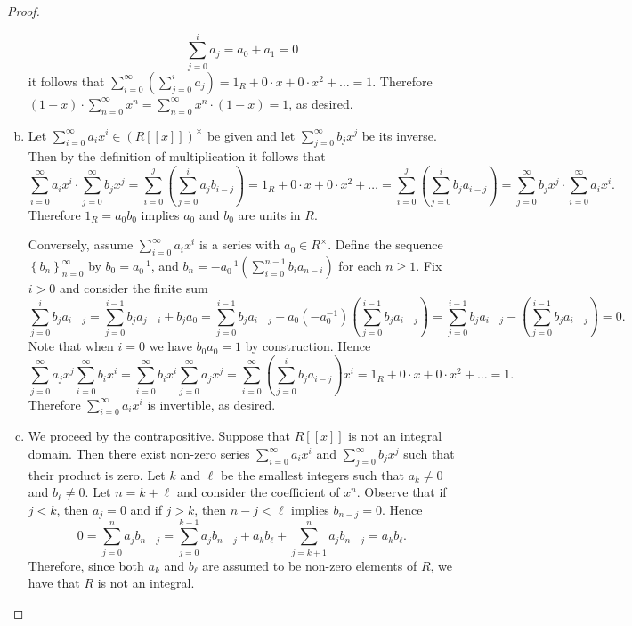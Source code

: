 \documentclass[10pt]{amsart}
\begin{document}
\begin{thm}
\begin{proof}
\begin{enumerate}[(a)]
\begin{equation*}
        \sum_{j=0}^i a_j = a_0 + a_1 = 0
      \end{equation*}
      it follows that $\sum_{i=0}^\infty\left(\sum_{j=0}^i a_j\right) = 1_R + 0\cdot x + 0 \cdot x^2 + \ldots = 1$.
      Therefore $(1 - x) \cdot \sum_{n = 0}^\infty x^n = \sum_{n = 0}^\infty x^n \cdot (1 - x) = 1$, as desired.
    \item
      Let $\sum_{i=0}^\infty a_ix^i \in (R[[x]])^\times$ be given and let $\sum_{j=0}^\infty b_jx^j$ be its inverse.
      Then by the definition of multiplication it follows that
      $$\sum_{i=0}^\infty a_ix^i \cdot \sum_{j=0}^\infty b_jx^j = \sum_{i=0}^j\left(\sum_{j=0}^i a_jb_{i-j}\right) = 1_R + 0\cdot x + 0\cdot x^2 + \ldots = \sum_{i=0}^j\left(\sum_{j=0}^i b_j a_{i-j}\right) = \sum_{j=0}^\infty b_jx^j \cdot \sum_{i=0}^\infty a_ix^i.$$
      Therefore $1_R = a_0b_0$ implies $a_0$ and $b_0$ are units in $R$.
      
      Conversely, assume $\sum_{i=0}^\infty a_ix^i$ is a series with $a_0 \in R^\times$.
      Define the sequence $\left\{b_n\right\}_{n=0}^\infty$ by $b_0 = a_0^{-1}$, and $b_n = -a_0^{-1}\left(\sum_{i=0}^{n-1} b_ia_{n-i}\right)$ for each $n \geq 1$.
      Fix $i > 0$ and consider the finite sum
      $$\sum_{j=0}^i b_ja_{i-j} = \sum_{j=0}^{i-1} b_ja_{j-i} + b_ja_0 = \sum_{j=0}^{i-1} b_ja_{i-j} + a_0(-a_0^{-1})\left(\sum_{j=0}^{i-1} b_ja_{i-j}\right) = \sum_{j=0}^{i-1} b_ja_{i-j} - \left(\sum_{j=0}^{i-1} b_ja_{i-j}\right) = 0.$$
      Note that when $i = 0$ we have $b_0a_0 = 1$ by construction.
      Hence 
      $$\sum_{j=0}^\infty a_jx^j\sum_{i=0}^\infty b_ix^i = \sum_{i=0}^\infty b_ix^i \sum_{j=0}^\infty a_jx^j = \sum_{i=0}^\infty \left(\sum_{j=0}^i b_ja_{i-j}\right)x^i = 1_R + 0\cdot x + 0\cdot x^2 + \ldots = 1.$$
      Therefore $\sum_{i=0}^\infty a_ix^i$ is invertible, as desired.
    \item
      We proceed by the contrapositive.
      Suppose that $R[[x]]$ is not an integral domain.
      Then there exist non-zero series $\sum_{i=0}^\infty a_ix^i$ and $\sum_{j=0}^\infty b_jx^j$ such that their product is zero.
      Let $k$ and $\ell$ be the smallest integers such that $a_k \neq 0$ and $b_\ell \neq 0$.
      Let $n = k + \ell$ and consider the coefficient of $x^n$.
      Observe that if $j < k$, then $a_j = 0$ and if $j > k$, then $n - j < \ell$ implies $b_{n-j} = 0$.
      Hence
      $$0 = \sum_{j=0}^{n} a_jb_{n-j} = \sum_{j=0}^{k-1} a_jb_{n-j} + a_kb_\ell + \sum_{j=k+1}^n a_jb_{n-j} = a_kb_\ell.$$
      Therefore, since both $a_k$ and $b_\ell$ are assumed to be non-zero elements of $R$, we have that $R$ is not an integral.
    \end{enumerate}
  \end{proof}
\end{thm}
\end{document}
